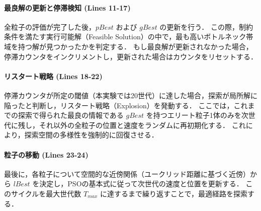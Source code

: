 \paragraph{最良解の更新と停滞検知 (Lines 11-17)}
全粒子の評価が完了した後，$pBest$ および $gBest$ の更新を行う．
この際，制約条件を満たす実行可能解（Feasible Solution）の中で，最も高いボトルネック帯域を持つ解が見つかったかを判定する．
もし最良解が更新されなかった場合，停滞カウンタをインクリメントし，更新された場合はカウンタをリセットする．

\paragraph{リスタート戦略 (Lines 18-22)}
停滞カウンタが所定の閾値（本実験では20世代）に達した場合，探索が局所解に陥ったと判断し，リスタート戦略（Explosion）を発動する．
ここでは，これまでの探索で得られた最良の情報である $gBest$ を持つエリート粒子1体のみを次世代に残し，それ以外の全粒子の位置と速度をランダムに再初期化する．
これにより，探索空間の多様性を強制的に回復させる．

\paragraph{粒子の移動 (Lines 23-24)}
最後に，各粒子について空間的な近傍関係（ユークリッド距離に基づく近傍）から $lBest$ を決定し，PSOの基本式に従って次世代の速度と位置を更新する．
このサイクルを最大世代数 $T_{max}$ に達するまで繰り返すことで，最適経路を探索する．